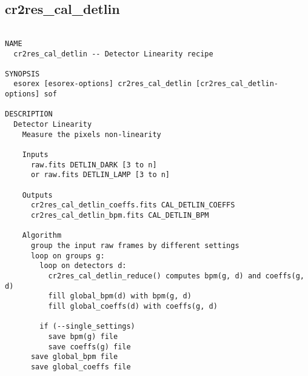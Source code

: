 \subsection{cr2res\_cal\_detlin}
\begin{verbatim}

NAME
  cr2res_cal_detlin -- Detector Linearity recipe

SYNOPSIS
  esorex [esorex-options] cr2res_cal_detlin [cr2res_cal_detlin-options] sof

DESCRIPTION
  Detector Linearity                                                      
    Measure the pixels non-linearity                                      
                                                                          
    Inputs                                                                
      raw.fits DETLIN_DARK [3 to n]                        
      or raw.fits DETLIN_LAMP [3 to n]                     
                                                                          
    Outputs                                                               
      cr2res_cal_detlin_coeffs.fits CAL_DETLIN_COEFFS  
      cr2res_cal_detlin_bpm.fits CAL_DETLIN_BPM        
                                                                          
    Algorithm                                                             
      group the input raw frames by different settings                    
      loop on groups g:                                                   
        loop on detectors d:                                              
          cr2res_cal_detlin_reduce() computes bpm(g, d) and coeffs(g, d)  
          fill global_bpm(d) with bpm(g, d)                               
          fill global_coeffs(d) with coeffs(g, d)                         
                                                                          
        if (--single_settings)                                            
          save bpm(g) file                                                
          save coeffs(g) file                                             
      save global_bpm file                                                
      save global_coeffs file                                             
                                                                          

\end{verbatim}
